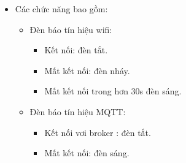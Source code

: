 \documentclass[a4paper,12pt,oneside]{article}
\begin{document}
\begin{enumerate}
\begin{itemize}
\begin{itemize}
		\end{itemize}
	\item Các chức năng bao gồm:
	\begin{itemize}
		\item Đèn báo tín hiệu wifi:
		\begin{itemize}
		\item Kết nối: đèn tắt.
		\item Mất kết nối: đèn nháy.
		\item Mất kết nối trong hơn 30s đèn sáng.
		\end{itemize}				
		
		\item Đèn báo tín hiệu MQTT:
		\begin{itemize}
		\item Kết nối vơi broker : đèn tắt.
		\item Mất kết nối: đèn sáng.


\end{itemize}
\end{itemize}
\end{itemize}
\end{enumerate}
\end{document}
